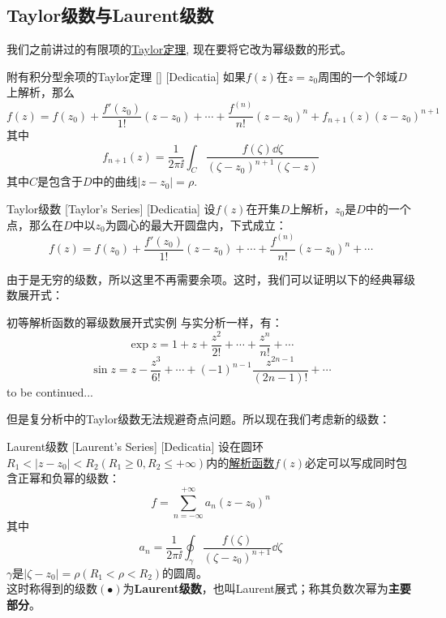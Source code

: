 \documentclass[UTF8]{ctexart}
\newcommand{\continued}{{\Large to be continued...}}
\newcommand{\AnalyticalFunction}{\hyperref[dfn:AnalyticalFunction]{解析函数}}
\newcommand{\TaylorThm}{\hyperref[thm:Taylor]{Taylor定理}}
\begin{document}
\subsection{Taylor级数与Laurent级数}
我们之前讲过的有限项的\TaylorThm , 现在要将它改为幂级数的形式。
\begin{thm}
    [UUID]
    {附有积分型余项的Taylor定理}
    []
    [Dedicatia]
    如果$f(z)$在$z=z_0$周围的一个邻域$D$上解析，那么
    \[f(z)=f(z_0)+\frac{f'(z_0)}{1!}(z-z_0)+\cdots+\frac{f^{(n)}}{n!}(z-z_0)^n+f_{n+1}(z)(z-z_0)^{n+1}\]
    其中
    \[f_{n+1}(z)=\frac{1}{2\pi\ii}\int_C\frac{f(\zeta)\dd{\zeta}}{(\zeta-z_0)^{n+1}(\zeta-z)}\]
    其中$C$是包含于$D$中的曲线$|z-z_0|=\rho$. 
\end{thm}
\begin{thm}
    [TaylorSeries]
    {Taylor级数}
    [Taylor's Series]
    [Dedicatia]
    设$f(z)$在开集$D$上解析，$z_0$是$D$中的一个点，那么在$D$中以$z_0$为圆心的最大开圆盘内，下式成立：
    \[f(z)=f(z_0)+\frac{f'(z_0)}{1!}(z-z_0)+\cdots+\frac{f^{(n)}}{n!}(z-z_0)^n+\cdots\]
\end{thm}
由于是无穷的级数，所以这里不再需要余项。这时，我们可以证明以下的经典幂级数展开式：
\begin{xmp}
    {初等解析函数的幂级数展开式实例\label{xmp:TaylorCommon}}
    与实分析一样，有：
    \[\exp z=1+z+\frac{z^2}{2!}+\cdots+\frac{z^n}{n!}+\cdots\]
    \[\sin z=z-\frac{z^3}{6!}+\cdots+(-1)^{n-1}\frac{z^{2n-1}}{(2n-1)!}+\cdots\]
    \continued
\end{xmp}
但是复分析中的Taylor级数无法规避奇点问题。所以现在我们考虑新的级数：
\begin{thm}
    [Laurent]
    {Laurent级数}
    [Laurent's Series]
    [Dedicatia]
    设在圆环$R_1<|z-z_0|<R_2(R_1\geqslant 0, R_2\leqslant+\infty )$内的\AnalyticalFunction $f(z)$必定可以写成同时包含正幂和负幂的级数：
    \[f=\sum_{n=-\infty}^{+\infty}a_n(z-z_0)^n\tag{$\bullet$}\]
    其中
    \[a_n=\frac{1}{2\pi\ii}\oint_{\gamma}\frac{f(\zeta)}{(\zeta-z_0)^{n+1}}\dd{\zeta}\]
    $\gamma$是$|\zeta-z_0|=\rho(R_1<\rho< R_2)$的圆周。\\
    这时称得到的级数$(\bullet)$为\textbf{Laurent级数}，也叫Laurent展式；称其负数次幂为\textbf{主要部分}。
\end{thm}
\end{document}
